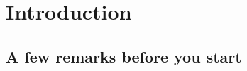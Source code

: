 \chapter{Introduction}
\label{chapter:intro}
\thispagestyle{myheadings}

\section{A few remarks before you start}
\label{sec:history}

